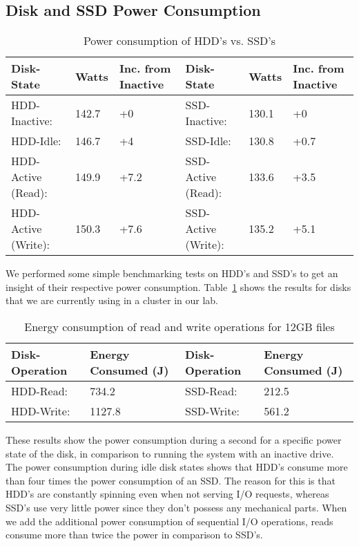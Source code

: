 \subsection{Disk and SSD Power Consumption}

\begin{table}
  \centering
  \resizebox{\linewidth}{!}
  {
    \begin{tabular}{|l|l|l|l|l|l|}
      \hline
      \bf Disk-State & \bf Watts & \bf Inc. from Inactive & \bf Disk-State & \bf
      Watts & \bf Inc. from Inactive \\ \hline
      HDD-Inactive:       & 142.7 & +0   & SSD-Inactive:       & 130.1 & +0   \\
      \hline
      HDD-Idle:           & 146.7 & +4   & SSD-Idle:           & 130.8 & +0.7 \\
      \hline
      HDD-Active (Read):  & 149.9 & +7.2 & SSD-Active (Read):  & 133.6 & +3.5 \\
      \hline
      HDD-Active (Write): & 150.3 & +7.6 & SSD-Active (Write): & 135.2 & +5.1 \\
      \hline
    \end{tabular}
  }
  \caption{Power consumption of HDD's vs. SSD's}
  \label{tab:power-consumption}
\end{table}

We performed some simple benchmarking tests on HDD's and SSD's to get an insight
of their respective power consumption. Table~\ref{tab:power-consumption} shows
the results for disks that we are currently using in a cluster in our lab.

\begin{table}
  \centering
  \resizebox{\linewidth}{!}
  {
    \begin{tabular}{|l|l|l|l|}
      \hline
      \bf Disk-Operation & \bf Energy Consumed (J) & \bf Disk-Operation & \bf
      Energy Consumed (J) \\ \hline
      HDD-Read:  & 734.2  & SSD-Read:  & 212.5 \\ \hline
      HDD-Write: & 1127.8 & SSD-Write: & 561.2 \\ \hline
    \end{tabular}
  }
  \caption{Energy consumption of read and write operations for 12GB files}
  \label{tab:energy-consumption}
\end{table}

These results show the power consumption during a second for a specific power
state of the disk, in comparison to running the system with an inactive
drive. The power consumption during idle disk states shows that HDD's consume
more than four times the power consumption of an SSD. The reason for this is
that HDD's are constantly spinning even when not serving I/O requests, whereas
SSD's use very little power since they don't possess any mechanical parts. When
we add the additional power consumption of sequential I/O operations, reads
consume more than twice the power in comparison to SSD's.

